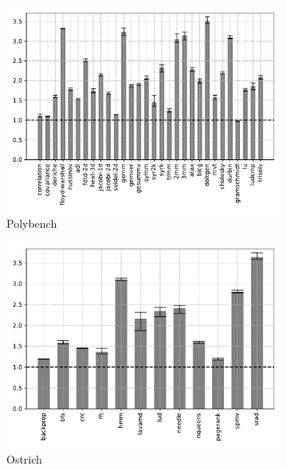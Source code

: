 \begin{figure}
    \centering
    \begin{subfigure}[t]{\textwidth}
        \includegraphics[width=\textwidth]{Images/6.2.RQ2/polybench-opt-speedup}
        \caption{Polybench}
    \end{subfigure}
    \begin{subfigure}[t]{.45\textwidth}
        \includegraphics[width=\textwidth]{Images/6.2.RQ2/ostrich-opt-speedup}
        \caption{Ostrich}
    \end{subfigure}
    \begin{subfigure}[t]{.45\textwidth}

\end{subfigure}
\end{figure}
